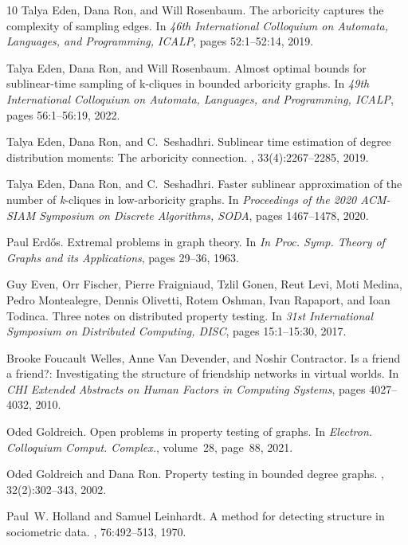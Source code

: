 \documentclass{article}
\begin{document}
\begin{thebibliography}{10}
Talya Eden, Dana Ron, and Will Rosenbaum.
\newblock The arboricity captures the complexity of sampling edges.
\newblock In {\em 46th International Colloquium on Automata, Languages, and
  Programming, {ICALP}}, pages 52:1--52:14, 2019.

Talya Eden, Dana Ron, and Will Rosenbaum.
\newblock Almost optimal bounds for sublinear-time sampling of k-cliques in
  bounded arboricity graphs.
\newblock In {\em 49th International Colloquium on Automata, Languages, and
  Programming, {ICALP}}, pages 56:1--56:19, 2022.

Talya Eden, Dana Ron, and C.~Seshadhri.
\newblock Sublinear time estimation of degree distribution moments: The
  arboricity connection.
, 33(4):2267--2285, 2019.

Talya Eden, Dana Ron, and C.~Seshadhri.
\newblock Faster sublinear approximation of the number of \emph{k}-cliques in
  low-arboricity graphs.
\newblock In {\em Proceedings of the 2020 {ACM-SIAM} Symposium on Discrete
  Algorithms, {SODA}}, pages 1467--1478, 2020.

Paul Erd\H{o}s.
\newblock Extremal problems in graph theory.
\newblock In {\em In Proc. Symp. Theory of Graphs and its Applications}, pages
  29--36, 1963.

Guy Even, Orr Fischer, Pierre Fraigniaud, Tzlil Gonen, Reut Levi, Moti Medina,
  Pedro Montealegre, Dennis Olivetti, Rotem Oshman, Ivan Rapaport, and Ioan
  Todinca.
\newblock Three notes on distributed property testing.
\newblock In {\em 31st International Symposium on Distributed Computing,
  {DISC}}, pages 15:1--15:30, 2017.

Brooke {Foucault Welles}, Anne {Van Devender}, and Noshir Contractor.
\newblock Is a friend a friend?: Investigating the structure of friendship
  networks in virtual worlds.
\newblock In {\em CHI Extended Abstracts on Human Factors in Computing
  Systems}, pages 4027--4032, 2010.

Oded Goldreich.
\newblock Open problems in property testing of graphs.
\newblock In {\em Electron. Colloquium Comput. Complex.}, volume~28, page~88,
  2021.

Oded Goldreich and Dana Ron.
\newblock Property testing in bounded degree graphs.
, 32(2):302--343, 2002.

Paul~W. Holland and Samuel Leinhardt.
\newblock A method for detecting structure in sociometric data.
, 76:492--513, 1970.


\end{thebibliography}
\end{document}
